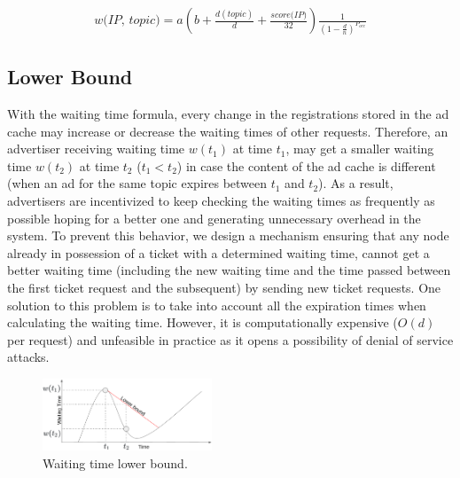 \begin{equation}
\begin{split}
    \textit{w(IP, topic)} = 
    a(b + \frac{d(topic)}{d} + \frac{\textit{score(IP)}}{32}
    )
    \frac{1}{(1-\frac{d}{n})^{P_\textit{occ}}}
\end{split}
\end{equation}



\subsection{Lower Bound}
With the waiting time formula, every change in the registrations stored in the ad cache may increase or decrease the waiting times of other requests. 
Therefore, an advertiser receiving waiting time $w(t_1)$ at time $t_1$, may get a smaller waiting time $w(t_2)$ at time $t_2$ ($t_1 < t_2$) in case the content of the ad cache is different (\eg when an ad for the same topic expires between $t_1$ and $t_2$). 
As a result, advertisers are incentivized to keep checking the waiting times as frequently as possible hoping for a better one and generating unnecessary overhead in the system.
To prevent this behavior, we design a mechanism ensuring that any node already in possession of a ticket with a determined waiting time, cannot get a better waiting time (including the new waiting time and the time passed between the first ticket request and the subsequent) by sending new ticket requests.
One solution to this problem is to take into account all the expiration times when calculating the waiting time. 
However, it is computationally expensive (\eg $O(d)$ per request) and unfeasible in practice as it opens a possibility of denial of service attacks.

\begin{figure}
    \includegraphics[width=0.45\textwidth]{img/lower_bound.png}
    \vspace{-0.05in}
    \caption{Waiting time lower bound.}
    \label{fig:lower_bound}
    \vspace{-0.15in}
\end{figure}

